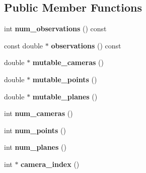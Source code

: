 \begin{DoxyCompactItemize}
\subsection*{Public Member Functions}
\begin{DoxyCompactItemize}
\item 
\hypertarget{classbaProblem_a7c58929484cf2b00ed3549d9bf344ecc}{int {\bfseries num\-\_\-observations} () const }\label{d0/d13/classbaProblem_a7c58929484cf2b00ed3549d9bf344ecc}

\item 
\hypertarget{classbaProblem_a3cdc19362c8fca6eda57757da2041062}{const double $\ast$ {\bfseries observations} () const }\label{d0/d13/classbaProblem_a3cdc19362c8fca6eda57757da2041062}

\item 
\hypertarget{classbaProblem_ac85772625fb48c5c8ee6c16e91cf104d}{double $\ast$ {\bfseries mutable\-\_\-cameras} ()}\label{d0/d13/classbaProblem_ac85772625fb48c5c8ee6c16e91cf104d}

\item 
\hypertarget{classbaProblem_ac1010047fee15558fddfeadd2cecf27d}{double $\ast$ {\bfseries mutable\-\_\-points} ()}\label{d0/d13/classbaProblem_ac1010047fee15558fddfeadd2cecf27d}

\item 
\hypertarget{classbaProblem_adb7fdfcbd20d9f008bc6396bae264a70}{double $\ast$ {\bfseries mutable\-\_\-planes} ()}\label{d0/d13/classbaProblem_adb7fdfcbd20d9f008bc6396bae264a70}

\item 
\hypertarget{classbaProblem_ae22aaf7bf698f0a0feea98f870fd9208}{int {\bfseries num\-\_\-cameras} ()}\label{d0/d13/classbaProblem_ae22aaf7bf698f0a0feea98f870fd9208}

\item 
\hypertarget{classbaProblem_a9e5a516d78d2f91ac47cc9aa7a805f57}{int {\bfseries num\-\_\-points} ()}\label{d0/d13/classbaProblem_a9e5a516d78d2f91ac47cc9aa7a805f57}

\item 
\hypertarget{classbaProblem_a519b1cf504b357a558d20324331e2d2b}{int {\bfseries num\-\_\-planes} ()}\label{d0/d13/classbaProblem_a519b1cf504b357a558d20324331e2d2b}

\item 
\hypertarget{classbaProblem_a77c73af5dc63e58f9dcb1d6879e21e2c}{int $\ast$ {\bfseries camera\-\_\-index} ()}\label{d0/d13/classbaProblem_a77c73af5dc63e58f9dcb1d6879e21e2c}


\end{DoxyCompactItemize}
\end{DoxyCompactItemize}

